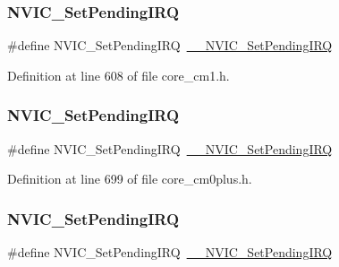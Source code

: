 \subsubsection{\texorpdfstring{N\+V\+I\+C\+\_\+\+Set\+Pending\+I\+RQ}{NVIC\_SetPendingIRQ}\hspace{0.1cm}{\footnotesize\ttfamily [2/13]}}
{\footnotesize\ttfamily \#define N\+V\+I\+C\+\_\+\+Set\+Pending\+I\+RQ~\hyperlink{group___c_m_s_i_s___core___n_v_i_c_functions_gaabefdd4b790b9a7308929938c0c1e1ad}{\+\_\+\+\_\+\+N\+V\+I\+C\+\_\+\+Set\+Pending\+I\+RQ}}



Definition at line 608 of file core\+\_\+cm1.\+h.

\mbox{\label{group___c_m_s_i_s___core___n_v_i_c_functions_ga2b47e2e52cf5c48a5c3348636434b3ac}} 
\subsubsection{\texorpdfstring{N\+V\+I\+C\+\_\+\+Set\+Pending\+I\+RQ}{NVIC\_SetPendingIRQ}\hspace{0.1cm}{\footnotesize\ttfamily [3/13]}}
{\footnotesize\ttfamily \#define N\+V\+I\+C\+\_\+\+Set\+Pending\+I\+RQ~\hyperlink{group___c_m_s_i_s___core___n_v_i_c_functions_gaabefdd4b790b9a7308929938c0c1e1ad}{\+\_\+\+\_\+\+N\+V\+I\+C\+\_\+\+Set\+Pending\+I\+RQ}}



Definition at line 699 of file core\+\_\+cm0plus.\+h.

\mbox{\label{group___c_m_s_i_s___core___n_v_i_c_functions_ga2b47e2e52cf5c48a5c3348636434b3ac}} 
\subsubsection{\texorpdfstring{N\+V\+I\+C\+\_\+\+Set\+Pending\+I\+RQ}{NVIC\_SetPendingIRQ}\hspace{0.1cm}{\footnotesize\ttfamily [4/13]}}
{\footnotesize\ttfamily \#define N\+V\+I\+C\+\_\+\+Set\+Pending\+I\+RQ~\hyperlink{group___c_m_s_i_s___core___n_v_i_c_functions_gaabefdd4b790b9a7308929938c0c1e1ad}{\+\_\+\+\_\+\+N\+V\+I\+C\+\_\+\+Set\+Pending\+I\+RQ}}



